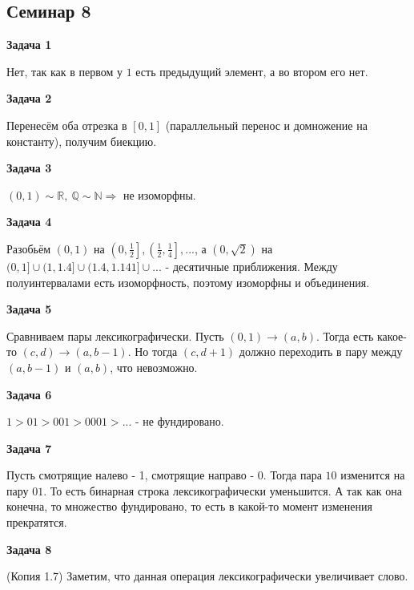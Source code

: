 \subsection{Семинар 8}
\begin{center}
\textbf{Задача 1}
\end{center}
Нет, так как в первом у $\displaystyle 1$ есть предыдущий элемент, а во втором его нет.

\begin{center}
\textbf{Задача 2}
\end{center}
Перенесём оба отрезка в $\displaystyle [ 0,1]$ (параллельный перенос и домножение на константу), получим биекцию.

\begin{center}
\textbf{Задача 3}
\end{center}
$\displaystyle ( 0,1) \sim \mathbb{R} ,\ \mathbb{Q} \sim \mathbb{N} \Longrightarrow $ не изоморфны.

\begin{center}
\textbf{Задача 4}
\end{center}
Разобьём $\displaystyle ( 0,1)$ на $\displaystyle \left( 0,\frac{1}{2}\right] ,\left(\frac{1}{2} ,\frac{1}{4}\right] ,...$, а $\displaystyle \left( 0,\sqrt{2}\right)$ на $\displaystyle ( 0,1] \cup ( 1,1.4] \cup ( 1.4,1.141] \cup ...$ - десятичные приближения. Между полуинтервалами есть изоморфность, поэтому изоморфны и объединения.

\begin{center}
\textbf{Задача 5}
\end{center}
Сравниваем пары лексикографически. Пусть $\displaystyle ( 0,1)\rightarrow ( a,b)$. Тогда есть какое-то $\displaystyle ( c,d)\rightarrow ( a,b-1)$. Но тогда $\displaystyle ( c,d+1)$ должно переходить в пару между $\displaystyle ( a,b-1)$ и $\displaystyle ( a,b)$, что невозможно.

\begin{center}
\textbf{Задача 6}
\end{center}
 $\displaystyle 1 >01 >001 >0001 >...$ - не фундировано.

\begin{center}
\textbf{Задача 7}
\end{center}
Пусть смотрящие налево - 1, смотрящие направо - 0. Тогда пара $\displaystyle 10$ изменится на пару $\displaystyle 01$. То есть бинарная строка лексикографически уменьшится. А так как она конечна, то множество фундировано, то есть в какой-то момент изменения прекратятся.

\begin{center}
\textbf{Задача 8}
\end{center}
(Копия 1.7) Заметим, что данная операция лексикографически увеличивает слово.


